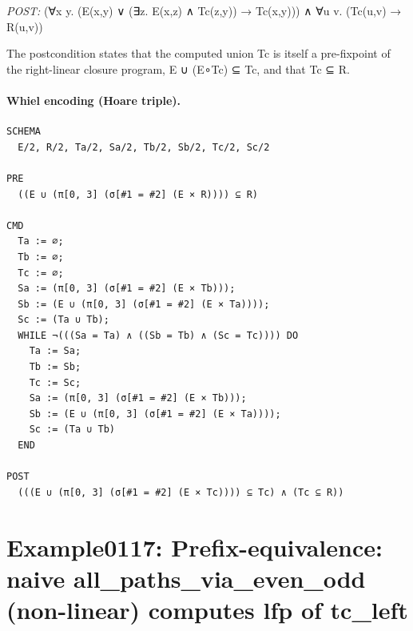 \documentclass[10pt]{article}
\begin{document}
\textit{POST:} (∀x y. (E(x,y) ∨ (∃z. E(x,z) ∧ Tc(z,y)) → Tc(x,y))) ∧ ∀u v. (Tc(u,v) → R(u,v))\par The postcondition states that the computed union Tc is itself a pre-fixpoint of the right-linear closure program, E ∪ (E∘Tc) ⊆ Tc, and that Tc ⊆ R.

\paragraph{Whiel encoding (Hoare triple).}

\begin{Verbatim}[fontsize=\scriptsize,breaklines=true,breakanywhere=true,frame=single,framesep=1.5mm]
SCHEMA
  E/2, R/2, Ta/2, Sa/2, Tb/2, Sb/2, Tc/2, Sc/2

PRE
  ((E ∪ (π[0, 3] (σ[#1 = #2] (E × R)))) ⊆ R)

CMD
  Ta := ∅;
  Tb := ∅;
  Tc := ∅;
  Sa := (π[0, 3] (σ[#1 = #2] (E × Tb)));
  Sb := (E ∪ (π[0, 3] (σ[#1 = #2] (E × Ta))));
  Sc := (Ta ∪ Tb);
  WHILE ¬(((Sa = Ta) ∧ ((Sb = Tb) ∧ (Sc = Tc)))) DO
    Ta := Sa;
    Tb := Sb;
    Tc := Sc;
    Sa := (π[0, 3] (σ[#1 = #2] (E × Tb)));
    Sb := (E ∪ (π[0, 3] (σ[#1 = #2] (E × Ta))));
    Sc := (Ta ∪ Tb)
  END

POST
  (((E ∪ (π[0, 3] (σ[#1 = #2] (E × Tc)))) ⊆ Tc) ∧ (Tc ⊆ R))
\end{Verbatim}

\Needspace{0.45\textheight}

\section{Example0117: Prefix-equivalence: naive all\_paths\_via\_even\_odd (non-linear) computes lfp of tc\_left}\label{case:Example0117}
\end{document}
